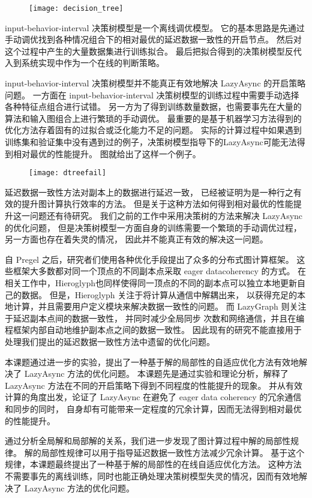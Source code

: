\begin{figure}[!htbp]
\centering
\texttt{[image: decision\_tree]}
\label{fig:dtree}
\end{figure}


input-behavior-interval 决策树模型是一个离线调优模型。
它的基本思路是先通过手动调优找到各种情况组合下的相对最优的延迟数据一致性的开启节点。
然后对这个过程中产生的大量数据集进行训练拟合。
最后把拟合得到的决策树模型反代入到系统实现中作为一个在线的判断策略。


input-behavior-interval 决策树模型并不能真正有效地解决 LazyAsync 的开启策略问题。
一方面在 input-behavior-interval 决策树模型的训练过程中需要手动选择各种特征点组合进行试错。
另一方为了得到训练数量数据，也需要事先在大量的算法和输入图组合上进行繁琐的手动调优。
最重要的是基于机器学习方法得到的优化方法存着固有的过拟合或泛化能力不足的问题。
实际的计算过程中如果遇到训练集和验证集中没有遇到过的例子，决策树模型指导下的LazyAsync可能无法得到相对最优的性能提升。
图\label{fig:dtfail}就给出了这样一个例子。

\begin{figure}[!htbp]
\centering
\texttt{[image: dtreefail]}
\label{fig:dtfail}
\end{figure}

延迟数据一致性方法对副本上的数据进行延迟一致，
已经被证明为是一种行之有效的提升图计算执行效率的方法。
但是关于这种方法如何得到相对最优的性能提升这一问题还有待研究。
我们之前的工作中采用决策树的方法来解决 LazyAsync 的优化问题，
但是决策树模型一方面自身的训练需要一个繁琐的手动调优过程，另一方面也存在着失灵的情况，
因此并不能真正有效的解决这一问题。


自 Pregel 之后，研究者们使用各种优化手段提出了众多的分布式图计算框架。
这些框架大多数都对同一个顶点的不同副本点采取 eager datacoherency 的方式。
在相关工作中，Hieroglyph\cite{ju2017hieroglyph}也同样使得同一顶点的不同的副本点可以独立本地更新自己的数据。
但是，Hieroglyph 关注于将计算从通信中解耦出来， 以获得充足的本地计算，并且需要用户定义模块来解决数据一致性的问题。
而 LazyGraph 则关注于延迟副本点间的数据一致性， 并同时减少全局同步 次数和网络通信，并且在编程框架内部自动地维护副本点之间的数据一致性。 
因此现有的研究不能直接用于处理我们提出的延迟数据一致性方法中遗留的优化问题。


本课题通过进一步的实验，提出了一种基于解的局部性的自适应优化方法有效地解决了 LazyAsync 方法的优化问题。
本课题先是通过实验和理论分析，解释了LazyAsync 方法在不同的开启策略下得到不同程度的性能提升的现象。
并从有效计算的角度出发，论证了 LazyAsync 在避免了 eager data coherency 的冗余通信和同步的同时，
自身却有可能带来一定程度的冗余计算，因而无法得到相对最优的性能提升。

通过分析全局解和局部解的关系，我们进一步发现了图计算过程中解的局部性规律。
解的局部性规律可以用于指导延迟数据一致性方法减少冗余计算。
基于这个规律，本课题最终提出了一种基于解的局部性的在线自适应优化方法。
这种方法不需要事先的离线训练，同时也能正确处理决策树模型失灵的情况，因而有效地解决了
LazyAsync 方法的优化问题。
